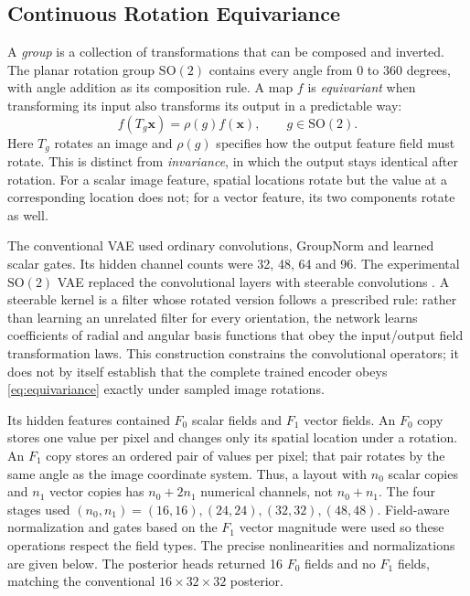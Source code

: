 \documentclass[conference,a4paper]{IEEEtran}
\newcommand{\SOtwo}{\mathrm{SO}(2)}
\begin{document}
\subsection{Continuous Rotation Equivariance}

A \emph{group} is a collection of transformations that can be composed and
inverted. The planar rotation group $\SOtwo$ contains every angle from
$0$ to $360$ degrees, with angle addition as its composition rule. A map
$f$ is \emph{equivariant} when transforming its input also transforms its
output in a predictable way:
\begin{equation}
f(T_g\mathbf{x})=\rho(g)f(\mathbf{x}),\qquad g\in\SOtwo.
\label{eq:equivariance}
\end{equation}
Here $T_g$ rotates an image and $\rho(g)$ specifies how the output feature
field must rotate. This is distinct from \emph{invariance}, in which the
output stays identical after rotation. For a scalar image feature, spatial
locations rotate but the value at a corresponding location does not; for a
vector feature, its two components rotate as well.

The conventional VAE used ordinary convolutions, GroupNorm and learned scalar
gates. Its hidden channel counts were 32, 48, 64 and 96. The experimental
$\SOtwo$ VAE replaced the convolutional layers with steerable convolutions
\cite{cohen_steerable_2017,weiler_general_2019}. A steerable kernel is a
filter whose rotated version follows a prescribed rule: rather than learning
an unrelated filter for every orientation, the network learns coefficients
of radial and angular basis functions that obey the input/output field
transformation laws. This construction constrains the convolutional
operators; it does not by itself establish that the complete trained encoder
obeys \autoref{eq:equivariance} exactly under sampled image rotations.

Its hidden features contained $F_0$ scalar fields and $F_1$ vector fields.
An $F_0$ copy stores one value per pixel and changes only its spatial
location under a rotation. An $F_1$ copy stores an ordered pair of values per
pixel; that pair rotates by the same angle as the image coordinate system.
Thus, a layout with $n_0$ scalar copies and $n_1$ vector copies has
$n_0+2n_1$ numerical channels, not $n_0+n_1$. The four stages used
$(n_0,n_1)=(16,16),(24,24),(32,32),(48,48)$. Field-aware normalization
and gates based on the $F_1$ vector magnitude were used so these operations
respect the field types. The precise nonlinearities and normalizations are
given below. The posterior heads returned 16 $F_0$ fields and
no $F_1$ fields, matching the conventional $16\times32\times32$ posterior.
\end{document}
